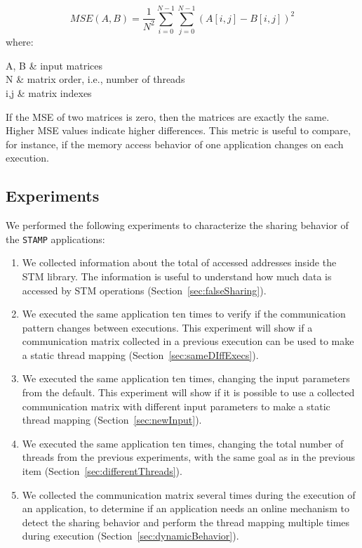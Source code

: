 \begin{samepage}
	\begin{equation}
		MSE(A, B) =  \frac{1}{N^2}\sum_{i=0}^{N-1}\sum_{j=0}^{N-1}(A[i,j]-B[i,j])^2
		\label{eq:MSE}
	\end{equation}
	where:
	\begin{conditions}
		A, B     &  input matrices \\
		N        &  matrix order, i.e., number of threads \\
		i,j      &  matrix indexes
	\end{conditions}
\end{samepage}

If the MSE of two matrices is zero, then the matrices are exactly the same. Higher MSE values indicate higher differences. This metric is useful to compare, for instance, if the memory access behavior of one application changes on each execution. %

\subsection{Experiments}\label{sec:experiments}

We performed the following experiments to characterize the sharing behavior of the \texttt{STAMP} applications:

\begin{enumerate}
	\item We collected information about the total of accessed addresses inside the STM library. The information is useful to understand how much data is accessed by STM operations (Section~\ref{sec:falseSharing}).
	
	\item We executed the same application ten times to verify if the communication pattern changes between executions. This experiment will show if a communication matrix collected in a previous execution can be used to make a static thread mapping (Section~\ref{sec:sameDIffExecs}).
	
	\item We executed the same application ten times, changing the input parameters from the default. This experiment will show if it is possible to use a collected communication matrix with different input parameters to make a static thread mapping (Section~\ref{sec:newInput}).
	
	\item We executed the same application ten times, changing the total number of threads from the previous experiments, with the same goal as in the previous item (Section~\ref{sec:differentThreads}).
	
	\item We collected the communication matrix several times during the execution of an application, to determine if an application needs an online mechanism to detect the sharing behavior and perform the thread mapping multiple times during execution (Section~\ref{sec:dynamicBehavior}).
\end{enumerate}

